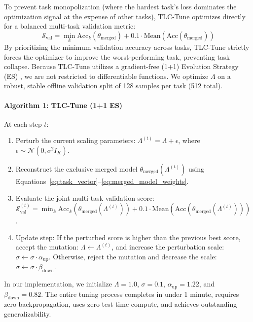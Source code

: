To prevent task monopolization (where the hardest task's loss dominates the optimization signal at the expense of other tasks), TLC-Tune optimizes directly for a balanced multi-task validation metric:
\begin{equation}
\label{eq:tlc_validation_metric}
\mathcal{S}_{\text{val}} = \min_{k} \text{Acc}_k(\theta_{\text{merged}}) + 0.1 \cdot \text{Mean}(\text{Acc}(\theta_{\text{merged}}))
\end{equation}
By prioritizing the minimum validation accuracy across tasks, TLC-Tune strictly forces the optimizer to improve the worst-performing task, preventing task collapse. Because TLC-Tune utilizes a gradient-free (1+1) Evolution Strategy (ES) \cite{rechenberg1978evolution}, we are not restricted to differentiable functions. We optimize $\Lambda$ on a robust, stable offline validation split of 128 samples per task (512 total).

\paragraph{Algorithm 1: TLC-Tune (1+1 ES)}
At each step $t$:
\begin{enumerate}
  \item Perturb the current scaling parameters: $\Lambda^{(t)} = \Lambda + \epsilon$, where $\epsilon \sim \mathcal{N}(0, \sigma^2 I_K)$.
  \item Reconstruct the exclusive merged model $\theta_{\text{merged}}(\Lambda^{(t)})$ using Equations~\ref{eq:task_vector}--\ref{eq:merged_model_weights}.
  \item Evaluate the joint multi-task validation score: $\mathcal{S}_{\text{val}}^{(t)} = \min_{k} \text{Acc}_k(\theta_{\text{merged}}(\Lambda^{(t)})) + 0.1 \cdot \text{Mean}(\text{Acc}(\theta_{\text{merged}}(\Lambda^{(t)})))$.
  \item Update step: If the perturbed score is higher than the previous best score, accept the mutation: $\Lambda \leftarrow \Lambda^{(t)}$, and increase the perturbation scale: $\sigma \leftarrow \sigma \cdot \alpha_{\text{up}}$. Otherwise, reject the mutation and decrease the scale: $\sigma \leftarrow \sigma \cdot \beta_{\text{down}}$.
\end{enumerate}
In our implementation, we initialize $\Lambda = \mathbf{1.0}$, $\sigma = 0.1$, $\alpha_{\text{up}} = 1.22$, and $\beta_{\text{down}} = 0.82$. The entire tuning process completes in under 1 minute, requires zero backpropagation, uses zero test-time compute, and achieves outstanding generalizability.